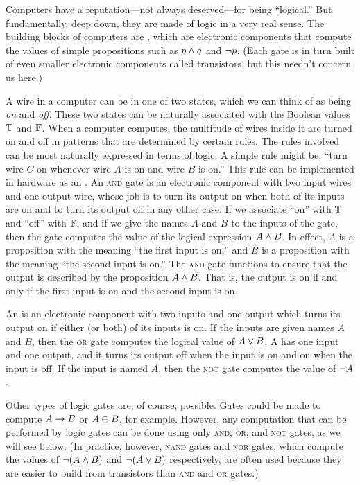 Computers have a reputation---not always deserved---for being ``logical.''
But fundamentally, deep down, they are made of logic in a very real
sense.  The building blocks of computers are ,
which are electronic components that compute the values of simple
propositions such as $p\wedge q$ and $\lnot p$.  (Each gate is in turn
built of even smaller electronic components called transistors,
but this needn't concern us here.)

A wire in a computer can be in one of two states, which we can
think of as being \emph{on} and \emph{off}.  These two states 
can be naturally associated with the Boolean values $\mathbb{T}$ and $\mathbb{F}$.
When a computer computes, the multitude of wires inside it are
turned on and off in patterns that are determined by certain rules.
The rules involved can be most naturally expressed in terms of logic.
A simple rule might be, ``turn wire $C$ on whenever wire $A$ is on
and wire $B$ is on.''  This rule can be implemented in hardware as
an .  An \textsc{and} gate is an electronic 
component with two input wires and one output wire, whose job is
to turn its output on when both of its inputs are on and to turn
its output off in any other case.  If we associate ``on'' with
$\mathbb{T}$ and ``off'' with $\mathbb{F}$, and if we give the names $A$ and $B$ to
the inputs of the gate, then the gate computes the value of the
logical expression $A\wedge B$.  In effect, $A$ is a proposition
with the meaning ``the first input is on,'' and $B$ is a proposition
with the meaning ``the second input is on.''  The \textsc{and} gate
functions to ensure that the output is described by the 
proposition $A \wedge B$.  That is, the output is on if and only if
the first input is on and the second input is on.

An  is an electronic component with two inputs
and one output which turns its output on if either (or both) of its
inputs is on.  If the inputs are given names $A$ and $B$, then
the \textsc{or} gate computes the logical value of $A\vee B$.
A  has one input and one output, and it turns
its output off when the input is on and on when the input is off.
If the input is named $A$, then the \textsc{not} gate computes the
value of $\lnot A$.

Other types of logic gates are, of course, possible.  Gates could
be made to compute $A\rightarrow B$ or $A\oplus B$, for example.  However,
any computation that can be performed by logic gates can be 
done using only \textsc{and}, \textsc{or}, and \textsc{not} gates,
as we will see below.  (In practice, however, \textsc{nand} gates and
\textsc{nor} gates, which compute the values of $\lnot(A\wedge B)$
and $\lnot(A\vee B)$ respectively, are often used because they
are easier to build from transistors than \textsc{and} and \textsc{or}
gates.)


